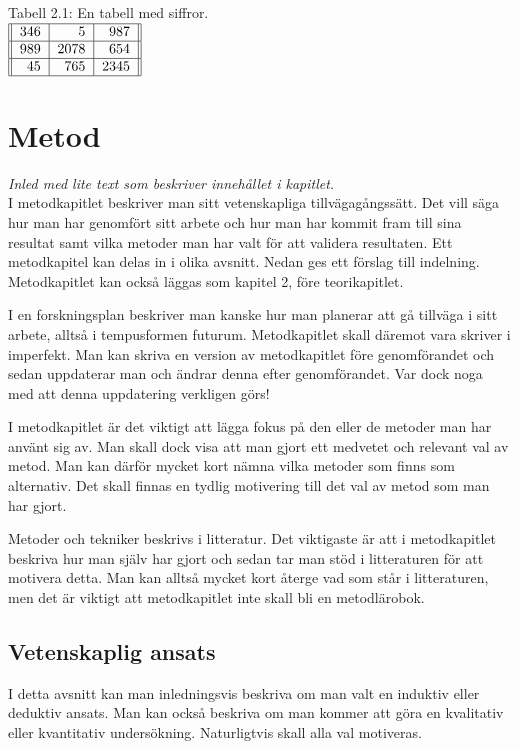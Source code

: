 \documentclass[a4paper,12pt]{article} %
\begin{document}
\begin{center}
Tabell 2.1: En tabell med siffror.\\[0.2cm]

$\begin{tabular} {||r|r|r||} \hline
346 & 5 & 987 \\ \hline
989 & 2078 & 654 \\ \hline
45 & 765 & 2345 \\ \hline
\end{tabular}$
\end{center}

\newpage

\section{Metod}
\emph{Inled med lite text som beskriver innehållet i kapitlet.}\\
I metodkapitlet beskriver man sitt vetenskapliga tillvägagångssätt. Det vill säga hur man har genomfört sitt arbete och hur man har kommit fram till sina resultat samt vilka metoder man har valt för att validera resultaten. Ett metodkapitel kan delas in i olika avsnitt. Nedan ges ett förslag till indelning. Metodkapitlet kan också läggas som kapitel 2, före teorikapitlet.

I en forskningsplan beskriver man kanske hur man planerar att gå tillväga i sitt arbete, alltså i tempusformen futurum. Metodkapitlet skall däremot vara skriver i imperfekt. Man kan skriva en version av metodkapitlet före genomförandet och sedan uppdaterar man och ändrar denna efter genomförandet. Var dock noga med att denna uppdatering verkligen görs!

I metodkapitlet är det viktigt att lägga fokus på den eller de metoder man har använt sig av. Man skall dock visa att man gjort ett medvetet och relevant val av metod. Man kan därför mycket kort nämna vilka metoder som finns som alternativ. Det skall finnas en tydlig motivering till det val av metod som man har gjort.

Metoder och tekniker beskrivs i litteratur. Det viktigaste är att i metodkapitlet beskriva hur man själv har gjort och sedan tar man stöd i litteraturen för att motivera detta. Man kan alltså mycket kort återge vad som står i litteraturen, men det är viktigt att metodkapitlet inte skall bli en metodlärobok.

\subsection{Vetenskaplig ansats}
I detta avsnitt kan man inledningsvis beskriva om man valt en induktiv eller deduktiv ansats. Man kan också beskriva om man kommer att göra en kvalitativ eller kvantitativ undersökning. Naturligtvis skall alla val motiveras.
\end{document}

